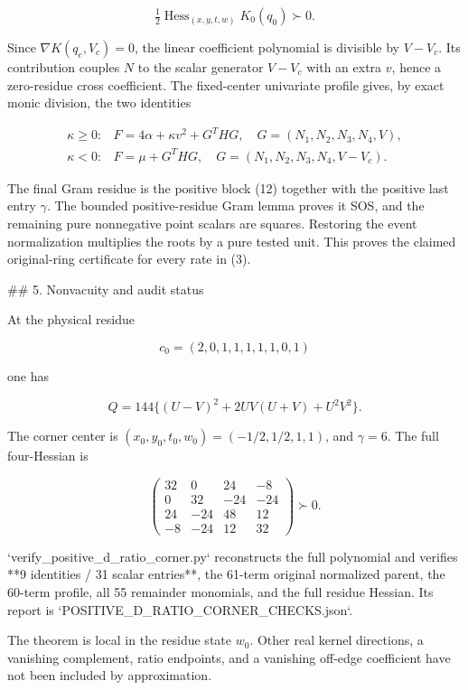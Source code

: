 \[
\tfrac12\operatorname{Hess}_{(x,y,t,w)}K_0(q_0)\succ0.
\tag{12}
\]

Since \(\nabla K(q_c,V_c)=0\), the linear coefficient polynomial is
divisible by \(V-V_c\). Its contribution couples \(N\) to the scalar
generator \(V-V_c\) with an extra \(v\), hence a zero-residue cross
coefficient. The fixed-center univariate profile gives, by exact monic
division, the two identities

\[
\begin{array}{ll}
\kappa\ge0:&F=4\alpha+\kappa v^2+G^THG,
\quad G=(N_1,N_2,N_3,N_4,V),\\[2mm]
\kappa<0:&F=\mu+G^THG,
\quad G=(N_1,N_2,N_3,N_4,V-V_c).
\end{array}
\tag{13}
\]

The final Gram residue is the positive block (12) together with the
positive last entry \(\gamma\). The bounded positive-residue Gram lemma
proves it SOS, and the remaining pure nonnegative point scalars are
squares. Restoring the event normalization multiplies the roots by a
pure tested unit. This proves the claimed original-ring certificate for
every rate in (3).

## 5. Nonvacuity and audit status

At the physical residue

\[
c_0=(2,0,1,1,1,1,1,0,1)
\]

one has

\[
Q=144\{(U-V)^2+2UV(U+V)+U^2V^2\}.
\]

The corner center is \((x_0,y_0,t_0,w_0)=(-1/2,1/2,1,1)\), and
\(\gamma=6\). The full four-Hessian is

\[
\begin{pmatrix}
32&0&24&-8\\0&32&-24&-24\\24&-24&48&12\\-8&-24&12&32
\end{pmatrix}\succ0.
\]

`verify_positive_d_ratio_corner.py` reconstructs the full polynomial and
verifies **9 identities / 31 scalar entries**, the 61-term original
normalized parent, the 60-term profile, all 55 remainder monomials, and
the full residue Hessian. Its report is
`POSITIVE_D_RATIO_CORNER_CHECKS.json`.

The theorem is local in the residue state \(w_0\). Other real kernel
directions, a vanishing complement, ratio endpoints, and a vanishing
off-edge coefficient have not been included by approximation.
